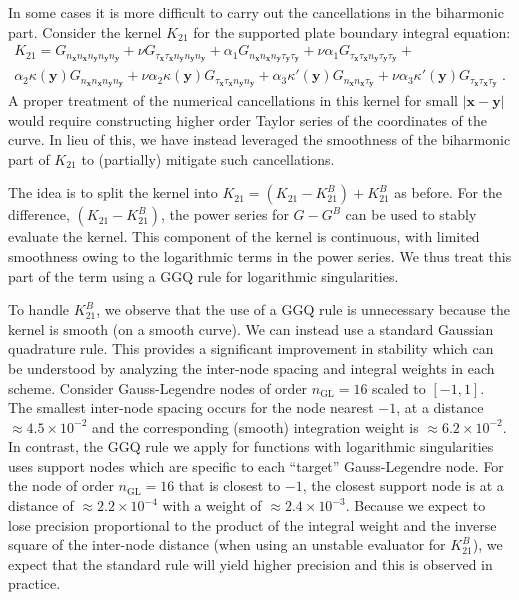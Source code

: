 \documentclass[preprint,12pt,3p]{elsarticle}
\newcommand{\bx}{{\mathbf{x}}}
\newcommand{\by}{{\mathbf{y}}}
\begin{document}
In some cases it is more difficult to carry out the cancellations in the biharmonic part. Consider the kernel $K_{21}$ for the supported plate boundary integral equation:
\begin{multline*}
K_{21} = G_{n_\mathbf{x} n_\mathbf{x} n_\mathbf{y} n_\mathbf{y} n_\mathbf{y}} + \nu  G_{\tau_\mathbf{x} \tau_\mathbf{x} n_\mathbf{y} n_\mathbf{y} n_\mathbf{y}}   + \alpha_1 G_{ n_\mathbf{x} n_\mathbf{x} n_\mathbf{y} \tau_\mathbf{y} \tau_\mathbf{y}} + \nu  \alpha_1 G_{\tau_\mathbf{x} \tau_\mathbf{x} n_\mathbf{y} \tau_\mathbf{y} \tau_\mathbf{y}} +  \\
   \alpha_2 \kappa(\mathbf{y}) G_{n_\mathbf{x} n_\mathbf{x} n_\mathbf{y} n_\mathbf{y} } +\nu \alpha_2 \kappa(\mathbf{y}) G_{\tau_\mathbf{x} \tau_\mathbf{x} n_\mathbf{y} n_\mathbf{y} } + \alpha_3 \kappa'(\mathbf{y}) G_{n_\mathbf{x} n_\mathbf{x} \tau_\mathbf{y} } + \nu \alpha_3 \kappa'(\mathbf{y}) G_{\tau_\mathbf{x} \tau_\mathbf{x} \tau_\mathbf{y} }\; .
\end{multline*}
A proper treatment of the numerical cancellations in this kernel for small
$|\bx-\by|$ would require constructing higher order Taylor series of the coordinates 
of the curve. In lieu of this, we have instead leveraged the smoothness of the biharmonic
part of $K_{21}$ to (partially) mitigate such cancellations.

The idea is to split the kernel into $K_{21} = (K_{21}-K_{21}^B) + K_{21}^B$
as before. For the difference, $(K_{21}-K_{21}^B)$, the power series
for $G-G^B$ can be used to stably evaluate the kernel. This component
of the kernel is continuous, with limited smoothness owing to the logarithmic
terms in the power series. We thus treat this part of the term using
a GGQ rule for logarithmic singularities.

To handle $K_{21}^B$, we observe that the use of a GGQ rule is unnecessary
because the kernel is smooth (on a smooth curve). We can instead use a
standard Gaussian quadrature rule. This provides a significant improvement
in stability which can be understood by analyzing the inter-node spacing
and integral weights in each scheme.
Consider Gauss-Legendre nodes of order $n_{\textrm{GL}}=16$
scaled to $[-1,1]$. The smallest inter-node spacing occurs for the
node nearest $-1$, at a distance $\approx 4.5 \times 10^{-2}$ and
the corresponding (smooth) integration weight is $\approx 6.2 \times 10^{-2}$.
In contrast, the GGQ rule we apply for functions with logarithmic singularities
uses support nodes which are specific to each ``target'' Gauss-Legendre node.
For the node of order $n_{\textrm{GL}}=16$ that is closest to $-1$, the
closest support node is at a distance of $\approx 2.2 \times 10^{-4}$
with a weight of $\approx 2.4 \times 10^{-3}$. Because we expect to lose
precision proportional to the product of the integral weight and
the inverse square of the inter-node distance (when using an unstable
evaluator for $K_{21}^B$), we expect that the standard rule will yield 
higher precision and this is observed in practice. 
\end{document}
